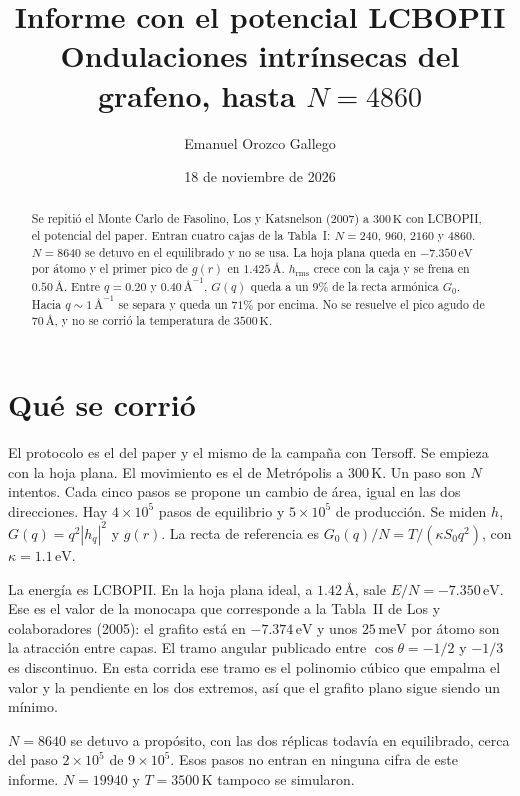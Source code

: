 \documentclass[11pt,a4paper]{article}
\title{Informe con el potencial LCBOPII\\[0.35em]
\large Ondulaciones intrínsecas del grafeno, hasta $N=4860$}
\author{Emanuel Orozco Gallego}
\date{18 de noviembre de 2026}
\begin{document}
\maketitle

\begin{abstract}
Se repitió el Monte Carlo de Fasolino, Los y Katsnelson (2007) a $300\,\mathrm{K}$
con LCBOPII, el potencial del paper.
Entran cuatro cajas de la Tabla~I: $N=240$, $960$, $2160$ y $4860$.
$N=8640$ se detuvo en el equilibrado y no se usa.
La hoja plana queda en $-7.350\,\mathrm{eV}$ por átomo y el primer pico de $g(r)$ en $1.425\,\text{\AA}$.
$h_{\mathrm{rms}}$ crece con la caja y se frena en $0.50\,\text{\AA}$.
Entre $q=0.20$ y $0.40\,\text{\AA}^{-1}$, $G(q)$ queda a un $9\%$ de la recta armónica $G_0$.
Hacia $q\sim 1\,\text{\AA}^{-1}$ se separa y queda un $71\%$ por encima.
No se resuelve el pico agudo de $70\,\text{\AA}$, y no se corrió la temperatura de $3500\,\mathrm{K}$.
\end{abstract}

\tableofcontents

\section{Qué se corrió}

El protocolo es el del paper y el mismo de la campaña con Tersoff.
Se empieza con la hoja plana.
El movimiento es el de Metrópolis a $300\,\mathrm{K}$.
Un paso son $N$ intentos.
Cada cinco pasos se propone un cambio de área, igual en las dos direcciones.
Hay $4\times 10^5$ pasos de equilibrio y $5\times 10^5$ de producción.
Se miden $h$, $G(q)=q^2|h_q|^2$ y $g(r)$.
La recta de referencia es $G_0(q)/N=T/(\kappa S_0 q^2)$, con $\kappa=1.1\,\mathrm{eV}$.

La energía es LCBOPII.
En la hoja plana ideal, a $1.42\,\text{\AA}$, sale $E/N=-7.350\,\mathrm{eV}$.
Ese es el valor de la monocapa que corresponde a la Tabla~II de Los y colaboradores (2005):
el grafito está en $-7.374\,\mathrm{eV}$ y unos $25\,\mathrm{meV}$ por átomo son la atracción entre capas.
El tramo angular publicado entre $\cos\theta=-1/2$ y $-1/3$ es discontinuo.
En esta corrida ese tramo es el polinomio cúbico que empalma el valor y la pendiente en los dos extremos, así que el grafito plano sigue siendo un mínimo.

$N=8640$ se detuvo a propósito, con las dos réplicas todavía en equilibrado, cerca del paso $2\times 10^5$ de $9\times 10^5$.
Esos pasos no entran en ninguna cifra de este informe.
$N=19940$ y $T=3500\,\mathrm{K}$ tampoco se simularon.
\end{document}
